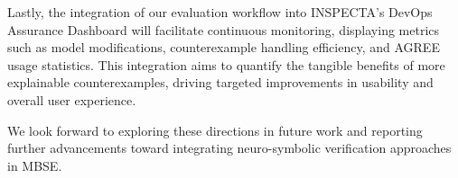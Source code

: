 Lastly, the integration of our evaluation workflow into INSPECTA’s DevOps Assurance Dashboard will facilitate continuous monitoring, displaying metrics such as model modifications, counterexample handling efficiency, and AGREE usage statistics. This integration aims to quantify the tangible benefits of more explainable counterexamples, driving targeted improvements in usability and overall user experience.

We look forward to exploring these directions in future work and reporting further advancements toward integrating neuro-symbolic verification approaches in MBSE.




